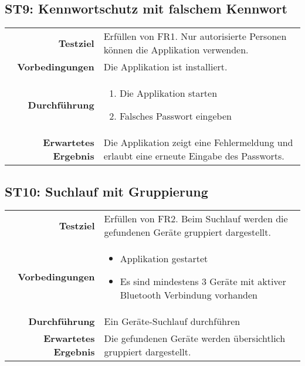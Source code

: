 \subsection{ST9: Kennwortschutz mit falschem Kennwort}
\begin{table}[H]
\begin{tabularx}{\textwidth}{r X }
\textbf{Testziel} & Erfüllen von \ac{FR}1. Nur autorisierte Personen können die Applikation verwenden.\\
\textbf{Vorbedingungen} & Die Applikation ist installiert.\\
\textbf{Durchführung} & \begin{enumerate}
\item Die Applikation starten
\item Falsches Passwort eingeben
\end{enumerate} \\
\textbf{Erwartetes Ergebnis} & Die Applikation zeigt eine Fehlermeldung und erlaubt eine erneute Eingabe des Passworts.\\
\end{tabularx}
\end{table}

\subsection{ST10: Suchlauf mit Gruppierung}
\begin{table}[H]
\begin{tabularx}{\textwidth}{r X }
\textbf{Testziel} & Erfüllen von \ac{FR}2. Beim Suchlauf werden die gefundenen Geräte gruppiert dargestellt.\\
\textbf{Vorbedingungen} & \begin{itemize}
\item Applikation gestartet
\item Es sind mindestens 3 Geräte mit aktiver Bluetooth Verbindung vorhanden
\end{itemize} \\
\textbf{Durchführung} & Ein Geräte-Suchlauf durchführen\\
\textbf{Erwartetes Ergebnis} & Die gefundenen Geräte werden übersichtlich gruppiert dargestellt.\\
\end{tabularx}
\end{table}

